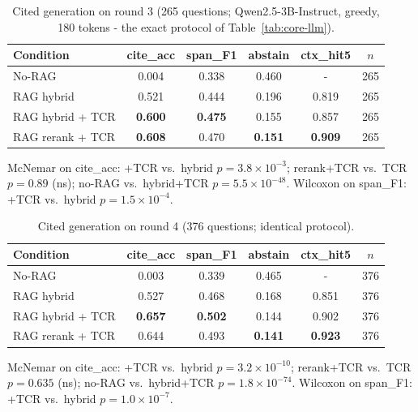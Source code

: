 \documentclass[10pt,a4paper,twocolumn]{article}
\begin{document}
\begin{table}[t]
\centering\footnotesize
\caption{Cited generation on round 3 (265 questions; Qwen2.5-3B-Instruct, greedy, 180 tokens - the exact protocol of Table~\ref{tab:core-llm}).}
\label{tab:ext3-llm}
\setlength{\tabcolsep}{2.6pt}
\begin{tabular}{lccccc}
\toprule
Condition & cite\_acc & span\_F1 & abstain & ctx\_hit5 & $n$ \\
\midrule
No-RAG & 0.004 & 0.338 & 0.460 & - & 265 \\
RAG hybrid & 0.521 & 0.444 & 0.196 & 0.819 & 265 \\
RAG hybrid + TCR & \textbf{0.600} & \textbf{0.475} & 0.155 & 0.857 & 265 \\
RAG rerank + TCR & \textbf{0.608} & 0.470 & \textbf{0.151} & \textbf{0.909} & 265 \\
\bottomrule
\end{tabular}

\vspace{3pt}
{\footnotesize McNemar on cite\_acc: +TCR vs.\ hybrid $p=3.8\times10^{-3}$; rerank+TCR vs.\ TCR $p=0.89$ (ns); no-RAG vs.\ hybrid+TCR $p=5.5\times10^{-48}$. Wilcoxon on span\_F1: +TCR vs.\ hybrid $p=1.5\times10^{-4}$.}
\end{table}

\begin{table}[t]
\centering\footnotesize
\caption{Cited generation on round 4 (376 questions; identical protocol).}
\label{tab:ext4-llm}
\setlength{\tabcolsep}{2.6pt}
\begin{tabular}{lccccc}
\toprule
Condition & cite\_acc & span\_F1 & abstain & ctx\_hit5 & $n$ \\
\midrule
No-RAG & 0.003 & 0.339 & 0.465 & - & 376 \\
RAG hybrid & 0.527 & 0.468 & 0.168 & 0.851 & 376 \\
RAG hybrid + TCR & \textbf{0.657} & \textbf{0.502} & 0.144 & 0.902 & 376 \\
RAG rerank + TCR & 0.644 & 0.493 & \textbf{0.141} & \textbf{0.923} & 376 \\
\bottomrule
\end{tabular}

\vspace{3pt}
{\footnotesize McNemar on cite\_acc: +TCR vs.\ hybrid $p=3.2\times10^{-10}$; rerank+TCR vs.\ TCR $p=0.635$ (ns); no-RAG vs.\ hybrid+TCR $p=1.8\times10^{-74}$. Wilcoxon on span\_F1: +TCR vs.\ hybrid $p=1.0\times10^{-7}$.}
\end{table}
\end{document}
